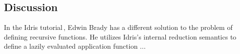 \subsection{Discussion}

In the Idris tutorial\,\cite{Brady:IdrisTutorial}, Edwin Brady has a different solution to the problem of defining recursive functions. He utilizes Idris's internal reduction semantics to define a lazily evaluated application function ...
